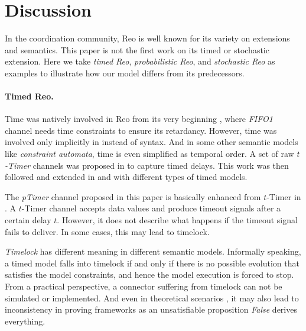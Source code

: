 \section{Discussion}
\label{sec:discussion}

In the coordination community, Reo is well known for its variety on extensions and semantics\cite{Jongmans2012}. This paper is not the first work on its timed or stochastic 
extension. Here we take \emph{timed Reo}, \emph{probabilistic Reo}, and \emph{stochastic Reo} 
as examples to illustrate how our model differs from its predecessors.

\paragraph{Timed Reo.}
Time was natively involved in Reo from its very beginning \cite{ARBAB2004}, where \emph{FIFO1} channel needs time constraints to ensure its retardancy. However, time was involved only implicitly in  \cite{ARBAB2004} instead of syntax. And in some other semantic models like \emph{constraint automata}, time is even simplified as temporal order. A set of raw \emph{$t$-Timer} channels was proposed in \cite{Arbab2006} to capture timed delays. This work was then followed and extended in \cite{Meng2007} and \cite{Meng2012} with different types of timed models.

The \emph{pTimer} channel proposed in this paper is basically enhanced from {$t$-Timer} in \cite{Meng2012}. A {$t$-Timer} channel accepts data values and produce timeout signals after a certain delay $t$. However, it does not describe what happens if the timeout signal fails to deliver. In some cases, this may lead to timelock.

\emph{Timelock} has different meaning in different semantic models. Informally speaking, a timed model falls into timelock if and only if there is no possible evolution that satisfies the model constraints, and hence the model execution is forced to stop. From a practical perspective, a connector suffering from timelock can not be simulated or implemented. And even in theoretical scenarios \cite{Li2015}, it may also lead to inconsistency in proving frameworks as an unsatisfiable proposition \emph{False} derives everything.

